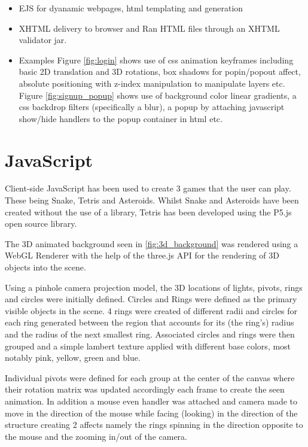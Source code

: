 \documentclass[a4paper]{article}
\begin{document}
\begin {itemize}
	\item EJS for dyanamic webpages, html templating and generation
    \item XHTML delivery to browser and Ran HTML files through an XHTML validator jar.
    \item Examples
    	\subitem Figure \ref{fig:login} shows use of css animation keyframes including basic 2D translation and 3D rotations, box shadows for popin/popout affect, absolute positioning with z-index manipulation to manipulate layers etc.
        \subitem Figure \ref{fig:signup_popup} shows use of background color linear gradients, a css backdrop filters (specifically a blur), a popup by attaching javascript show/hide handlers to the popup container in html etc.
\end {itemize}

\section{JavaScript}
Client-side JavaScript has been used to create 3 games that the user can play.
These being Snake, Tetris and Asteroids. Whilst Snake and Asteroids have been created without the use of a library, Tetris has been developed using the P5.js open source library.


The 3D animated background seen in \ref{fig:3d_background} was rendered using a WebGL Renderer with the help of the three.js API for the rendering of 3D objects into the scene.


Using a pinhole camera projection model, the 3D locations of lights, pivots, rings and circles were initially defined. Circles and Rings were defined as the primary visible objects in the scene. 4 rings were created of different radii and circles for each ring generated between the region that accounts for its (the ring's) radius and the radius of the next smallest ring.
Associated circles and rings were then grouped and a simple lambert texture applied with different base colors, most notably pink, yellow, green and blue.


Individual pivots were defined for each group at the center of the canvas where their rotation matrix was updated accordingly each frame to create the seen animation. In addition a mouse even handler was attached and camera made to move in the direction of the mouse while facing (looking) in the direction of the structure creating 2 affects namely the rings spinning in the direction opposite to the mouse and the zooming in/out of the camera.
\end{document}

